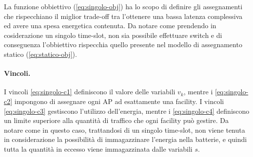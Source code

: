 La funzione obbiettivo (\ref{eq:singolo-obj}) ha lo scopo di definire gli assegnamenti che rispecchiano il miglior trade-off tra l'ottenere una bassa latenza complessiva ed avere una spesa energetica contenuta. Da notare come prendendo in cosiderazione un singolo time-slot, non sia possibile effettuare switch e di conseguenza l'obbiettivo rispecchia quello presente nel modello di assegnamento statico (\ref{eq:statico-obj}).

\paragraph*{Vincoli.}

I vincoli \ref{eq:singolo-c1} definiscono il valore delle variabili $v_k$, mentre i \ref{eq:singolo-c2} impongono di assegnare ogni AP ad esattamente una facility. I vincoli \ref{eq:singolo-c3} gestiscono l'utilizzo dell'energia, mentre i \ref{eq:singolo-c4} definiscono un limite superiore alla quantità di traffico che ogni facility può gestire. Da notare come in questo caso, trattandosi di un singolo time-slot, non viene tenuta in considerazione la possibilità di immagazzinare l'energia nella batterie, e quindi tutta la quantità in eccesso viene immagazzinata dalle variabili $s$.
